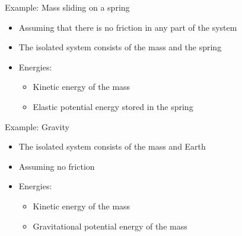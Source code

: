 \documentclass[12pt,compress,aspectratio=169]{beamer}
\newcommand{\mb}[1]{\ensuremath\mathbf{#1}}
\begin{document}
\begin{frame}{Example: Mass sliding on a spring}
  \begin{itemize}
  \item Assuming that there is no friction in any part of the system
  \item The isolated system consists of the mass and the spring 
  \item Energies:
    \begin{itemize}
    \item Kinetic energy of the mass
    \item Elastic potential energy stored in the spring
    \end{itemize}
  \end{itemize}
  \begin{center}
  \end{center}
\end{frame}


\begin{frame}{Example: Gravity}
  \begin{center}
  \end{center}
  
  \begin{itemize}
  \item The isolated system consists of the mass and Earth
  \item Assuming no friction
  \item Energies:
    \begin{itemize}
    \item Kinetic energy of the mass
    \item Gravitational potential energy of the mass
    \end{itemize}
  \end{itemize}
\end{frame}
\end{document}
